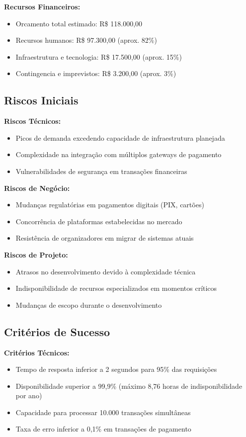 \textbf{Recursos Financeiros:}
\begin{itemize}
    \item Orcamento total estimado: R\$ 118.000,00
    \item Recursos humanos: R\$ 97.300,00 (aprox. 82\%)
    \item Infraestrutura e tecnologia: R\$ 17.500,00 (aprox. 15\%)
    \item Contingencia e imprevistos: R\$ 3.200,00 (aprox. 3\%)
\end{itemize}

\subsection{Riscos Iniciais}

\textbf{Riscos Técnicos:}
\begin{itemize}
    \item Picos de demanda excedendo capacidade de infraestrutura planejada
    \item Complexidade na integração com múltiplos gateways de pagamento
    \item Vulnerabilidades de segurança em transações financeiras
\end{itemize}

\textbf{Riscos de Negócio:}
\begin{itemize}
    \item Mudanças regulatórias em pagamentos digitais (PIX, cartões)
    \item Concorrência de plataformas estabelecidas no mercado
    \item Resistência de organizadores em migrar de sistemas atuais
\end{itemize}

\textbf{Riscos de Projeto:}
\begin{itemize}
    \item Atrasos no desenvolvimento devido à complexidade técnica
    \item Indisponibilidade de recursos especializados em momentos críticos
    \item Mudanças de escopo durante o desenvolvimento
\end{itemize}

\subsection{Critérios de Sucesso}

\textbf{Critérios Técnicos:}
\begin{itemize}
    \item Tempo de resposta inferior a 2 segundos para 95\% das requisições
    \item Disponibilidade superior a 99,9\% (máximo 8,76 horas de indisponibilidade por ano)
    \item Capacidade para processar 10.000 transações simultâneas
    \item Taxa de erro inferior a 0,1\% em transações de pagamento
\end{itemize}

